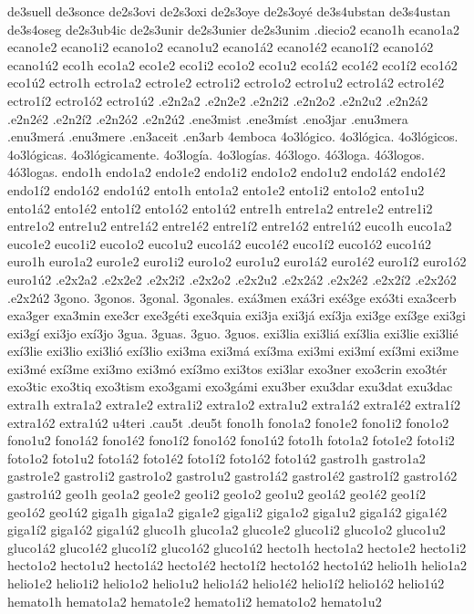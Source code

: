 {de3suell
de3sonce
de2s3ovi
de2s3oxi
de2s3oye
de2s3oyé
de3s4ubstan
de3s4ustan
de3s4oseg
de2s3ub4ic
de2s3unir
de2s3unier
de2s3unim
.diecio2
ecano1h
ecano1a2 ecano1e2 ecano1i2 ecano1o2 ecano1u2
ecano1á2 ecano1é2 ecano1í2 ecano1ó2 ecano1ú2
eco1h
eco1a2 eco1e2 eco1i2 eco1o2 eco1u2
eco1á2 eco1é2 eco1í2 eco1ó2 eco1ú2
ectro1h
ectro1a2 ectro1e2 ectro1i2 ectro1o2 ectro1u2
ectro1á2 ectro1é2 ectro1í2 ectro1ó2 ectro1ú2
.e2n2a2 .e2n2e2 .e2n2i2 .e2n2o2 .e2n2u2
.e2n2á2 .e2n2é2 .e2n2í2 .e2n2ó2 .e2n2ú2
.ene3mist
.ene3míst
.eno3jar
.enu3mera
.enu3merá
.enu3mere
.en3aceit
.en3arb
4emboca
4o3lógico.
4o3lógica.
4o3lógicos.
4o3lógicas.
4o3lógicamente.
4o3logía.
4o3logías.
4ó3logo.
4ó3loga.
4ó3logos.
4ó3logas.
endo1h
endo1a2 endo1e2 endo1i2 endo1o2 endo1u2
endo1á2 endo1é2 endo1í2 endo1ó2 endo1ú2
ento1h
ento1a2 ento1e2 ento1i2 ento1o2 ento1u2
ento1á2 ento1é2 ento1í2 ento1ó2 ento1ú2
entre1h
entre1a2 entre1e2 entre1i2 entre1o2 entre1u2
entre1á2 entre1é2 entre1í2 entre1ó2 entre1ú2
euco1h
euco1a2 euco1e2 euco1i2 euco1o2 euco1u2
euco1á2 euco1é2 euco1í2 euco1ó2 euco1ú2
euro1h
euro1a2 euro1e2 euro1i2 euro1o2 euro1u2
euro1á2 euro1é2 euro1í2 euro1ó2 euro1ú2
.e2x2a2 .e2x2e2 .e2x2i2 .e2x2o2 .e2x2u2
.e2x2á2 .e2x2é2 .e2x2í2 .e2x2ó2 .e2x2ú2
3gono.
3gonos.
3gonal.
3gonales.
exá3men
exá3ri
exé3ge
exó3ti
exa3cerb
exa3ger
exa3min
exe3cr
exe3géti
exe3quia
exi3ja
exi3já
exí3ja
exi3ge
exí3ge
exi3gi
exi3gí
exi3jo
exí3jo
3gua.
3guas.
3guo.
3guos.
exi3lia
exi3liá
exí3lia
exi3lie
exi3lié
exí3lie
exi3lio
exi3lió
exí3lio
exi3ma
exi3má
exí3ma
exi3mi
exi3mí
exí3mi
exi3me
exi3mé
exí3me
exi3mo
exi3mó
exí3mo
exi3tos
exi3lar
exo3ner
exo3crin
exo3tér
exo3tic
exo3tiq
exo3tism
exo3gami
exo3gámi
exu3ber
exu3dar
exu3dat
exu3dac
extra1h
extra1a2 extra1e2 extra1i2 extra1o2 extra1u2
extra1á2 extra1é2 extra1í2 extra1ó2 extra1ú2
u4teri
.cau5t
.deu5t
fono1h
fono1a2 fono1e2 fono1i2 fono1o2 fono1u2
fono1á2 fono1é2 fono1í2 fono1ó2 fono1ú2
foto1h
foto1a2 foto1e2 foto1i2 foto1o2 foto1u2
foto1á2 foto1é2 foto1í2 foto1ó2 foto1ú2
gastro1h
gastro1a2 gastro1e2 gastro1i2 gastro1o2 gastro1u2
gastro1á2 gastro1é2 gastro1í2 gastro1ó2 gastro1ú2
geo1h
geo1a2 geo1e2 geo1i2 geo1o2 geo1u2
geo1á2 geo1é2 geo1í2 geo1ó2 geo1ú2
giga1h
giga1a2 giga1e2 giga1i2 giga1o2 giga1u2
giga1á2 giga1é2 giga1í2 giga1ó2 giga1ú2
gluco1h
gluco1a2 gluco1e2 gluco1i2 gluco1o2 gluco1u2
gluco1á2 gluco1é2 gluco1í2 gluco1ó2 gluco1ú2
hecto1h
hecto1a2 hecto1e2 hecto1i2 hecto1o2 hecto1u2
hecto1á2 hecto1é2 hecto1í2 hecto1ó2 hecto1ú2
helio1h
helio1a2 helio1e2 helio1i2 helio1o2 helio1u2
helio1á2 helio1é2 helio1í2 helio1ó2 helio1ú2
hemato1h
hemato1a2 hemato1e2 hemato1i2 hemato1o2 hemato1u2
}
